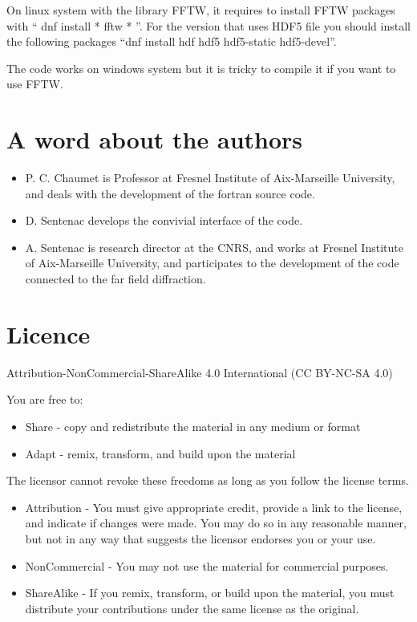On linux system with the library FFTW, it requires to install FFTW
packages with `` dnf install * fftw * ''. For the version that uses
HDF5 file you should install the following packages ``dnf install hdf
hdf5 hdf5-static hdf5-devel''.

The code works on windows system but it is tricky to compile it if you
want to use FFTW.



\section{A word about the authors}

\begin{itemize}
\item P. C. Chaumet is Professor at Fresnel Institute of Aix-Marseille
  University, and deals with the development of the fortran source
  code.
\item D. Sentenac develops the convivial interface of the code.
\item A. Sentenac is research director at the CNRS, and works at
  Fresnel Institute of Aix-Marseille University, and participates to
  the development of the code connected to the far field diffraction.
\end{itemize}

\section{Licence}


Attribution-NonCommercial-ShareAlike 4.0 International (CC BY-NC-SA 4.0)

You are free to:

\begin{itemize}
\item Share - copy and redistribute the material in any medium or
  format
\item Adapt - remix, transform, and build upon the material
\end{itemize}

The licensor cannot revoke these freedoms as long as you follow the
license terms.
\begin{itemize}
\item Attribution - You must give appropriate credit, provide a link
  to the license, and indicate if changes were made. You may do so in
  any reasonable manner, but not in any way that suggests the licensor
  endorses you or your use.
\item NonCommercial - You may not use the material for commercial
  purposes.
\item ShareAlike - If you remix, transform, or build upon the
  material, you must distribute your contributions under the same
  license as the original.
\end{itemize}


